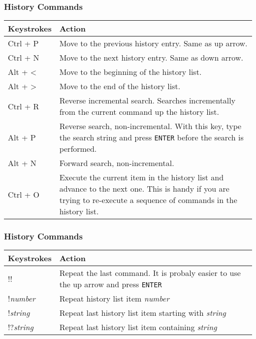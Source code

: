 \documentclass[12pt]{article}
\begin{document}
\subsubsection{History Commands}%
\begin{tabular}{|l|p{5in}|}
	\hline
	Keystrokes & Action\\ \hline
	Ctrl + P & Move to the previous history entry. Same as up arrow.\\
 	Ctrl + N & Move to the next history entry. Same as down arrow.\\
 	Alt + < & Move to the beginning of the history list.\\
 	Alt + > & Move to the end of the history list.\\
 	Ctrl + R & Reverse incremental search. Searches incrementally from the current command up the history list.\\
 	Alt + P & Reverse search, non-incremental. With this key, type the search string and press \texttt{ENTER} before the search is performed.\\
 	Alt + N & Forward search, non-incremental.\\
 	Ctrl + O & Execute the current item in the history list and advance to the next one. This is handy if you are trying to re-execute a sequence of commands in the history list.\\
	\hline
\end{tabular}

\subsubsection{History Commands}%
\begin{tabular}{|l|p{5in}|}
	\hline
	Keystrokes & Action\\ \hline
	!! & Repeat the last command. It is probaly easier to use the up arrow and press \texttt{ENTER}\\
	!\textit{number} & Repeat history list item \textit{number}\\
	!\textit{string} & Repeat last history list item starting with \textit{string}\\
	!?\textit{string} & Repeat last history list item containing \textit{string}\\
	\hline
\end{tabular}
\newpage
\end{document}
